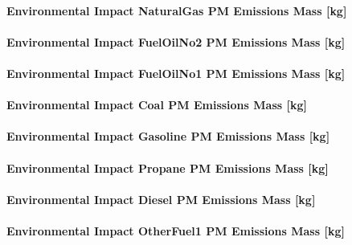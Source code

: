 \paragraph{Environmental Impact NaturalGas PM Emissions Mass {[}kg{]}}\label{environmental-impact-natural-gas-pm-emissions-mass-kg}

\paragraph{Environmental Impact FuelOilNo2 PM Emissions Mass {[}kg{]}}\label{environmental-impact-fuel-oil-2-pm-emissions-mass-kg}

\paragraph{Environmental Impact FuelOilNo1 PM Emissions Mass {[}kg{]}}\label{environmental-impact-fuel-oil-1-pm-emissions-mass-kg}

\paragraph{Environmental Impact Coal PM Emissions Mass {[}kg{]}}\label{environmental-impact-coal-pm-emissions-mass-kg}

\paragraph{Environmental Impact Gasoline PM Emissions Mass {[}kg{]}}\label{environmental-impact-gasoline-pm-emissions-mass-kg}

\paragraph{Environmental Impact Propane PM Emissions Mass {[}kg{]}}\label{environmental-impact-propane-pm-emissions-mass-kg}

\paragraph{Environmental Impact Diesel PM Emissions Mass {[}kg{]}}\label{environmental-impact-diesel-pm-emissions-mass-kg}

\paragraph{Environmental Impact OtherFuel1 PM Emissions Mass {[}kg{]}}\label{environmental-impact-otherfuel1-pm-emissions-mass-kg}

